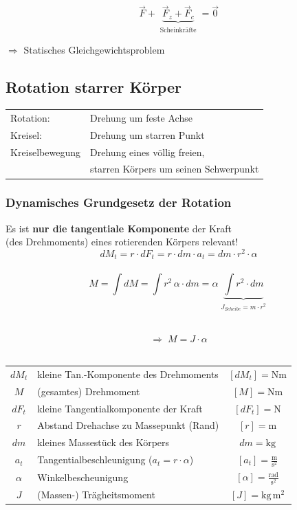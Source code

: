 			$$ \boxed{ \vec{F} + \underbrace{ \vec{F}_z + \vec{F}_c }_{\substack{\text{Scheinkräfte}}} = \vec{0} }$$ 
			
			$\Rightarrow$ Statisches Gleichgewichtsproblem

	\subsection{Rotation starrer Körper}
	
		\begin{tabular}{ll}
			Rotation: & Drehung um feste Achse \\
			Kreisel: & Drehung um starren Punkt \\
			Kreiselbewegung & Drehung eines völlig freien, \\
			&  starren Körpers um seinen Schwerpunkt \\
		\end{tabular}

		\subsubsection{Dynamisches Grundgesetz der Rotation}
			Es ist \textbf{nur die tangentiale Komponente} der Kraft \\
			(des Drehmoments) eines rotierenden Körpers relevant! \\
				
			$$dM_t = r \cdot dF_t = r \cdot dm \cdot a_t = dm \cdot r^2 \cdot \alpha$$ \\
			
			$$ \boxed{ M = \int dM = \int r^2 \, \alpha \cdot dm = \alpha  \underbrace{  \int r^2 \cdot dm }_{\substack{J_{Scheibe} = m \cdot r^2}} }$$ \
			
			$$ \boxed{ \Rightarrow \; M = J \cdot \alpha} $$ \\
				
			\begin{tabular}{c l c}
				$dM_t$ & kleine Tan.-Komponente des Drehmoments & $[dM_t] = \mathrm{Nm}$ \\
				$M$ & (gesamtes) Drehmoment & $[M] = \mathrm{Nm}$ \\
				$dF_t$ & kleine Tangentialkomponente der Kraft & $[dF_t] = \mathrm{N}$ \\
				$r$ & Abstand Drehachse zu Massepunkt (Rand) & $[r] = \mathrm{m}$ \\
				$dm$ & kleines Massestück des Körpers & $dm = \mathrm{kg}$ \\
				$a_t$ & Tangentialbeschleunigung ($a_t = r \cdot \alpha$) & $[a_t] = \mathrm{\frac{m}{s^2}}$ \\
				$\alpha$ & Winkelbescheunigung & $[\alpha] = \mathrm{\frac{rad}{s^2}}$ \\
				$J$ & (Massen-) Trägheitsmoment & $[J] = \mathrm{kg \, m^2}$ \\
			\end{tabular}

